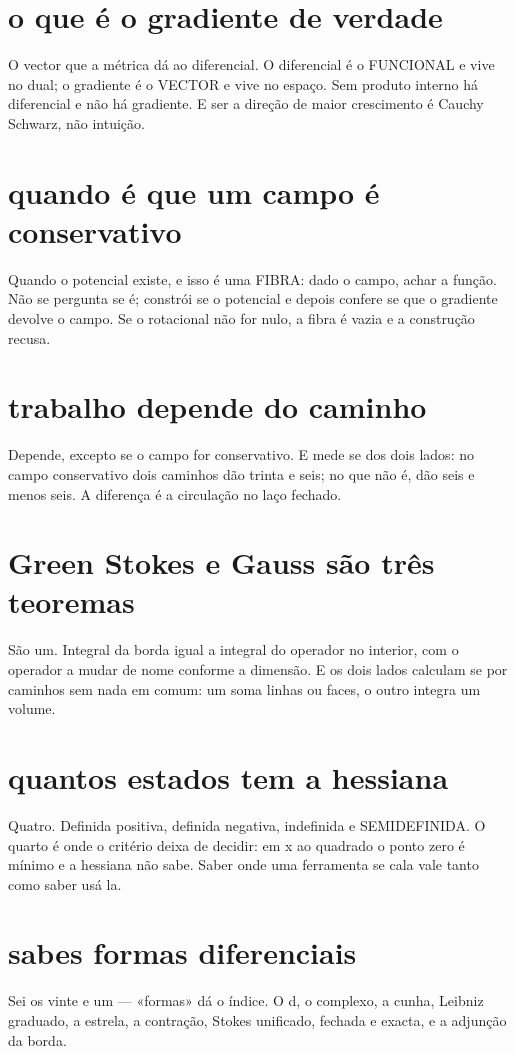 \documentclass[11pt,a4paper]{article}
\begin{document}
\section{o que é o gradiente de verdade}
O vector que a métrica dá ao diferencial. O diferencial é o FUNCIONAL e vive no dual; o
gradiente é o VECTOR e vive no espaço. Sem produto interno há diferencial e não há
gradiente. E ser a direção de maior crescimento é Cauchy Schwarz, não intuição.

\section{quando é que um campo é conservativo}
Quando o potencial existe, e isso é uma FIBRA: dado o campo, achar a função. Não se
pergunta se é; constrói se o potencial e depois confere se que o gradiente devolve o
campo. Se o rotacional não for nulo, a fibra é vazia e a construção recusa.

\section{trabalho depende do caminho}
Depende, excepto se o campo for conservativo. E mede se dos dois lados: no campo
conservativo dois caminhos dão trinta e seis; no que não é, dão seis e menos seis. A
diferença é a circulação no laço fechado.

\section{Green Stokes e Gauss são três teoremas}
São um. Integral da borda igual a integral do operador no interior, com o operador a
mudar de nome conforme a dimensão. E os dois lados calculam se por caminhos sem nada em
comum: um soma linhas ou faces, o outro integra um volume.

\section{quantos estados tem a hessiana}
Quatro. Definida positiva, definida negativa, indefinida e SEMIDEFINIDA. O quarto é onde
o critério deixa de decidir: em x ao quadrado o ponto zero é mínimo e a hessiana não
sabe. Saber onde uma ferramenta se cala vale tanto como saber usá la.

\section{sabes formas diferenciais}
Sei os vinte e um — «formas» dá o índice. O d, o complexo, a cunha, Leibniz graduado, a
estrela, a contração, Stokes unificado, fechada e exacta, e a adjunção da borda.
\end{document}
